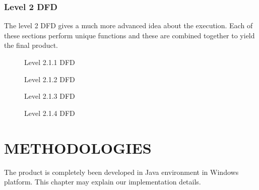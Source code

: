 \documentclass[12pt,a4paper,oneside]{report}
\begin{document}

\pagebreak
\subsection{Level 2 DFD}
The level 2 DFD gives a much more advanced idea about the execution. Each of these sections perform unique functions and these are combined together to yield the final product.
\begin{figure}[h]
\begin{center}
\vspace{2 in}
\hspace{.0 in}
\caption{Level 2.1.1 DFD}
\end{center}

\end{figure}
\begin{figure}[h]
\begin{center}
\caption{Level 2.1.2 DFD}
\end{center}
\end{figure}

\begin{figure}[h]
\begin{center}
\caption{Level 2.1.3 DFD}
\end{center}
\end{figure}

\begin{figure}[h]
\begin{center}
\caption{Level 2.1.4 DFD}
\end{center}
\end{figure}

\chapter{METHODOLOGIES}
The product is completely been developed in Java environment in Windows platform. This chapter may explain our implementation details.
\end{document}
